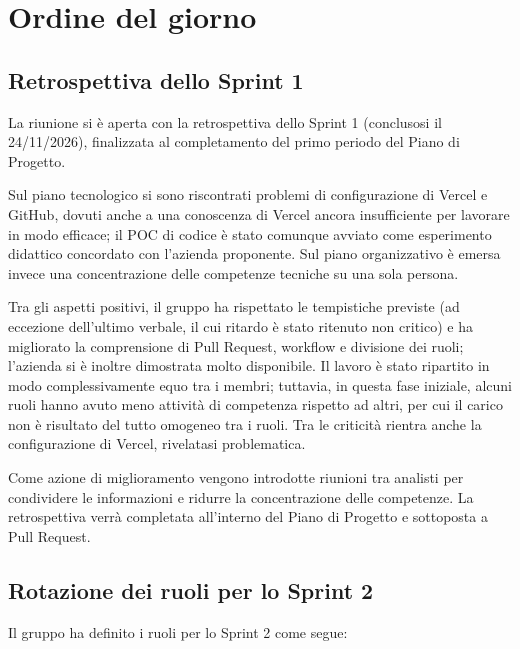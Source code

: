 \newpage
\vspace{0.8cm}

\section{Ordine del giorno}

\subsection{Retrospettiva dello Sprint 1}
La riunione si è aperta con la retrospettiva dello Sprint 1 (conclusosi il 24/11/2026), finalizzata al completamento del primo periodo del Piano di Progetto.

Sul piano tecnologico si sono riscontrati problemi di configurazione di Vercel e GitHub, dovuti anche a una conoscenza di Vercel ancora insufficiente per lavorare in modo efficace; il POC di codice è stato comunque avviato come esperimento didattico concordato con l'azienda proponente. Sul piano organizzativo è emersa invece una concentrazione delle competenze tecniche su una sola persona.

Tra gli aspetti positivi, il gruppo ha rispettato le tempistiche previste (ad eccezione dell'ultimo verbale, il cui ritardo è stato ritenuto non critico) e ha migliorato la comprensione di Pull Request, workflow e divisione dei ruoli; l'azienda si è inoltre dimostrata molto disponibile. Il lavoro è stato ripartito in modo complessivamente equo tra i membri; tuttavia, in questa fase iniziale, alcuni ruoli hanno avuto meno attività di competenza rispetto ad altri, per cui il carico non è risultato del tutto omogeneo tra i ruoli. Tra le criticità rientra anche la configurazione di Vercel, rivelatasi problematica.

Come azione di miglioramento vengono introdotte riunioni tra analisti per condividere le informazioni e ridurre la concentrazione delle competenze. La retrospettiva verrà completata all'interno del Piano di Progetto e sottoposta a Pull Request.

\subsection{Rotazione dei ruoli per lo Sprint 2}
Il gruppo ha definito i ruoli per lo Sprint 2 come segue:

